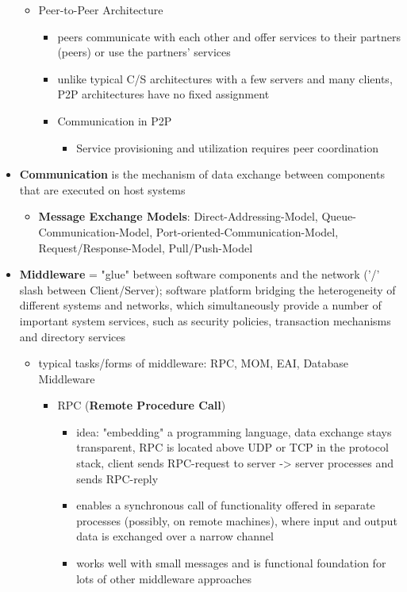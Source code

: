 \documentclass[11pt]{article}
\begin{document}
\begin{itemize}
\begin{itemize}
\item Peer-to-Peer Architecture
\begin{itemize}
\item peers communicate with each other and offer services to their partners (peers) or use the partners’ services
\item unlike typical C/S architectures with a few servers and many clients, P2P architectures have no fixed assignment
\item Communication in P2P
\begin{itemize}
\item Service provisioning and utilization requires peer coordination
\end{itemize}
\end{itemize}
\end{itemize}
\item \textbf{Communication} is the mechanism of data exchange between components that are executed on host systems
\begin{itemize}
\item \textbf{Message Exchange Models}: Direct-Addressing-Model, Queue-Communication-Model, Port-oriented-Communication-Model, Request/Response-Model, Pull/Push-Model
\end{itemize}
\item \textbf{Middleware} = "glue"  between software components and the network ('/' slash between Client/Server); software platform bridging the heterogeneity of different systems and networks, which simultaneously provide a number of important system services, such as security policies, transaction mechanisms and directory services
\begin{itemize}
\item typical tasks/forms of middleware: RPC, MOM, EAI, Database Middleware
\begin{itemize}
\item RPC (\textbf{Remote Procedure Call})
\begin{itemize}
\item idea: "embedding" a programming language, data exchange stays transparent, RPC is located above UDP or TCP in the protocol stack, client sends RPC-request to server -> server processes and sends RPC-reply
\item enables a synchronous call of functionality offered in separate processes (possibly, on remote machines), where input and output data is exchanged over a narrow channel
\item works well with small messages and is functional foundation for lots of other middleware approaches

\end{itemize}
\end{itemize}
\end{itemize}
\end{itemize}
\end{document}
